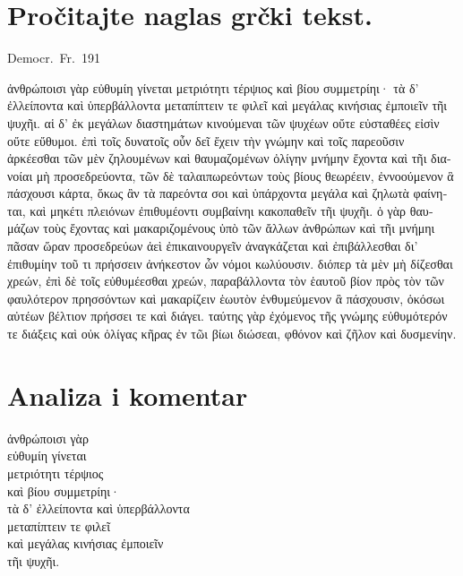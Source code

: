 
\section*{Pročitajte naglas grčki tekst.}

Democr.\ Fr.\ 191


\medskip


{\large

\begin{greek}

\noindent ἀνθρώποισι γὰρ εὐθυμίη γίνεται μετριότητι τέρψιος καὶ βίου συμμετρίηι· τὰ δ' ἐλλείποντα καὶ ὑπερβάλλοντα μεταπίπτειν τε φιλεῖ καὶ μεγάλας κινήσιας ἐμποιεῖν τῆι ψυχῆι. αἱ δ' ἐκ μεγάλων διαστημάτων κινούμεναι τῶν ψυχέων οὔτε εὐσταθέες εἰσὶν οὔτε εὔθυμοι. ἐπὶ τοῖς δυνατοῖς οὖν δεῖ ἔχειν τὴν γνώμην καὶ τοῖς παρεοῦσιν ἀρκέεσθαι τῶν μὲν ζηλουμένων καὶ θαυμαζομένων ὀλίγην μνήμην ἔχοντα καὶ τῆι διανοίαι μὴ προσεδρεύοντα, τῶν δὲ ταλαιπωρεόντων τοὺς βίους θεωρέειν, ἐννοούμενον ἃ πάσχουσι κάρτα, ὅκως ἂν τὰ παρεόντα σοι καὶ ὑπάρχοντα μεγάλα καὶ ζηλωτὰ φαίνηται, καὶ μηκέτι πλειόνων ἐπιθυμέοντι συμβαίνηι κακοπαθεῖν τῆι ψυχῆι. ὁ γὰρ θαυμάζων τοὺς ἔχοντας καὶ μακαριζομένους ὑπὸ τῶν ἄλλων ἀνθρώπων καὶ τῆι μνήμηι πᾶσαν ὥραν προσεδρεύων ἀεὶ ἐπικαινουργεῖν ἀναγκάζεται καὶ ἐπιβάλλεσθαι δι' ἐπιθυμίην τοῦ τι πρήσσειν ἀνήκεστον ὧν νόμοι κωλύουσιν. διόπερ τὰ μὲν μὴ δίζεσθαι χρεών, ἐπὶ δὲ τοῖς εὐθυμέεσθαι χρεών, παραβάλλοντα τὸν ἑαυτοῦ βίον πρὸς τὸν τῶν φαυλότερον πρησσόντων καὶ μακαρίζειν ἑωυτὸν ἐνθυμεύμενον ἃ πάσχουσιν, ὁκόσωι αὐτέων βέλτιον πρήσσει τε καὶ διάγει. ταύτης γὰρ ἐχόμενος τῆς γνώμης εὐθυμότερόν τε διάξεις καὶ οὐκ ὀλίγας κῆρας ἐν τῶι βίωι διώσεαι, φθόνον καὶ ζῆλον καὶ δυσμενίην. 

\end{greek}

}


\section*{Analiza i komentar}


{\large
\begin{greek}
\noindent ἀνθρώποισι γὰρ \\
εὐθυμίη γίνεται \\
\tabto{2em} μετριότητι τέρψιος \\
\tabto{2em} καὶ βίου συμμετρίηι·\\
τὰ δ' ἐλλείποντα καὶ ὑπερβάλλοντα \\
μεταπίπτειν τε φιλεῖ \\
καὶ μεγάλας κινήσιας ἐμποιεῖν \\
\tabto{2em} τῆι ψυχῆι. \\

\end{greek}
}

